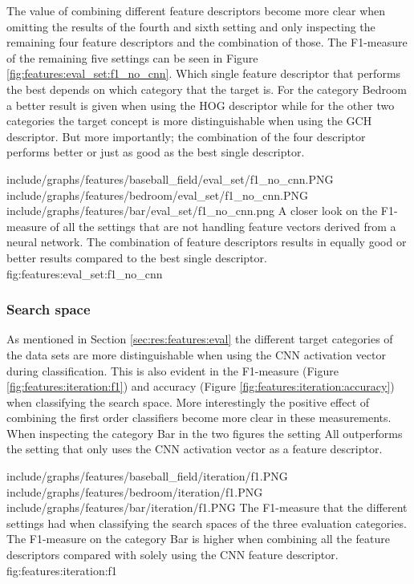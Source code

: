 The value of combining different feature descriptors become more clear when omitting the results of the fourth and sixth setting and only inspecting the remaining four feature descriptors and the combination of those. The F1-measure of the remaining five settings can be seen in Figure \ref{fig:features:eval_set:f1_no_cnn}. Which single feature descriptor that performs the best depends on which category that the target is. For the category Bedroom a better result is given when using the HOG descriptor while for the other two categories the target concept is more distinguishable when using the GCH descriptor. But more importantly; the combination of the four descriptor performs better or just as good as the best single descriptor. 


\tripfigure
{include/graphs/features/baseball_field/eval_set/f1_no_cnn.PNG}
{include/graphs/features/bedroom/eval_set/f1_no_cnn.PNG}
{include/graphs/features/bar/eval_set/f1_no_cnn.png}
{A closer look on the F1-measure of all the settings that are not handling feature vectors derived from a neural network. The combination of feature descriptors results in equally good or better results compared to the best single descriptor.}
{fig:features:eval_set:f1_no_cnn}

\subsubsection{Search space}
\label{sec:res:features:iter}

As mentioned in Section \ref{sec:res:features:eval} the different target categories of the data sets are more distinguishable when using the CNN activation vector during classification. This is also evident in the F1-measure (Figure \ref{fig:features:iteration:f1}) and accuracy (Figure \ref{fig:features:iteration:accuracy}) when classifying the search space. More interestingly the positive effect of combining the first order classifiers become more clear in these measurements. When inspecting the  category Bar in the two figures the setting All outperforms the setting that only uses the CNN activation vector as a feature descriptor.

\tripfigurenear
{include/graphs/features/baseball_field/iteration/f1.PNG}
{include/graphs/features/bedroom/iteration/f1.PNG}
{include/graphs/features/bar/iteration/f1.PNG}
{The F1-measure that the different settings had when classifying the search spaces of the three evaluation categories. The F1-measure on the category Bar is higher when combining all the feature descriptors compared with solely using the CNN feature descriptor.}
{fig:features:iteration:f1}

